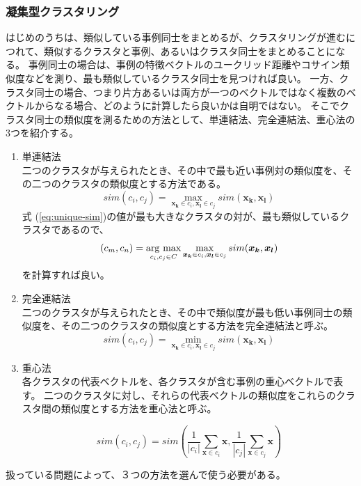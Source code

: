 \documentclass[titlepage,12pt]{jreport}
\newcommand{\argmax}{\mathop{\rm arg~max}\limits}
\begin{document}
\subsubsection{凝集型クラスタリング}
はじめのうちは、類似している事例同士をまとめるが、クラスタリングが進むにつれて、類似するクラスタと事例、あるいはクラスタ同士をまとめることになる。 事例同士の場合は、事例の特徴ベクトルのユークリッド距離やコサイン類似度などを測り、最も類似しているクラスタ同士を見つければ良い。 一方、クラスタ同士の場合、つまり片方あるいは両方が一つのベクトルではなく複数のベクトルからなる場合、どのように計算したら良いかは自明ではない。 そこでクラスタ同士の類似度を測るための方法として、単連結法、完全連結法、重心法の3つを紹介する。
\begin{enumerate}
\item 単連結法\\
二つのクラスタが与えられたとき、その中で最も近い事例対の類似度を、その二つのクラスタの類似度とする方法である。
\begin{equation}
sim(c_{i},c_{j}) = \max_{\bm{x_{k}}\in c_{i},\bm{x_{l}}\in c_{j}}sim(\bm{x_{k}},\bm{x_{l}})
	\label{eq:unique-sim}
\end{equation}
式 (\ref{eq:unique-sim})の値が最も大きなクラスタの対が、最も類似しているクラスタであるので、
\begin{equation}
(c_{m},c_{n}) = \argmax_{c_{i},c_{j}\in C} \max_{\bm{x_{k}}\in c_{i},\bm{x_{l}}\in c_{j}} sim(\bm{x_{k}},\bm{x_{l}})
\end{equation}
を計算すれば良い。
\item 完全連結法\\
二つのクラスタが与えられたとき、その中で類似度が最も低い事例同士の類似度を、その二つのクラスタの類似度とする方法を完全連結法と呼ぶ。
\begin{equation}
sim(c_{i},c_{j}) = \min_{\bm{x_{k}}\in c_{i},\bm{x_{l}}\in c_{j}}sim(\bm{x_{k}},\bm{x_{l}})
\end{equation}
\item 重心法 \\
各クラスタの代表ベクトルを、各クラスタが含む事例の重心ベクトルで表す。 二つのクラスタに対し、それらの代表ベクトルの類似度をこれらのクラスタ間の類似度とする方法を重心法と呼ぶ。

\begin{equation}
sim(c_{i},c_{j}) = sim(\frac{1}{|c_{i}|}\sum_{\bm{x}\in c_{i}}\bm{x},\frac{1}{|c_{j}|}\sum_{\bm{x}\in c_{j}}\bm{x})
\end{equation}
\end{enumerate}
扱っている問題によって、３つの方法を選んで使う必要がある。
\end{document}
